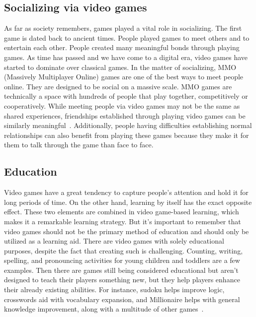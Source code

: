 \documentclass[10pt,twoside,english,a4paper]{article}
\begin{document}
\subsection{Socializing via video games}
As far as society remembers, games played a vital role in socializing. The first game is dated back to ancient times. People played games to meet others and to entertain each other. People created many meaningful bonds through playing games. As time has passed and we have come to a digital era, video games have started to dominate over classical games. In the matter of socializing, MMO (Massively Multiplayer Online) games are one of the best ways to meet people online. They are designed to be social on a massive scale. MMO games are technically a space with hundreds of people that play together, competitively or cooperatively. While meeting people via video games may not be the same as shared experiences, friendships established through playing video games can be similarly meaningful~\cite{poz-neg-sol}. Additionally, people having difficulties establishing normal relationships can also benefit from playing these games because they make it for them to talk through the game than face to face.

\subsection{Education}
Video games have a great tendency to capture people's attention and hold it for long periods of time. On the other hand, learning by itself has the exact opposite effect. These two elements are combined in video game-based learning, which makes it a remarkable learning strategy. But it's important to remember that video games should not be the primary method of education and should only be utilized as a learning aid. There are video games with solely educational purposes, despite the fact that creating such is challenging. Counting, writing, spelling, and pronouncing activities for young children and toddlers are a few examples. Then there are games still being considered educational but aren't designed to teach their players something new, but they help players enhance their already existing abilities. For instance, sudoku helps improve logic, crosswords aid with vocabulary expansion, and Millionaire helps with general knowledge improvement, along with a multitude of other games~\cite{learning}.
\end{document}
